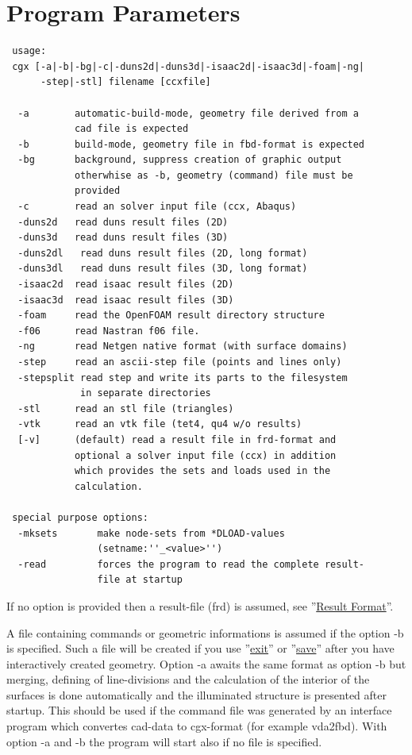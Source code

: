 \documentclass{article}
\providecommand{\htmlref}[2]{\hyperref[#2]{#1}}
\begin{document}
\section{\label{Program Parameters}Program Parameters}
\begin{verbatim}
 usage:
 cgx [-a|-b|-bg|-c|-duns2d|-duns3d|-isaac2d|-isaac3d|-foam|-ng|
      -step|-stl] filename [ccxfile]

  -a        automatic-build-mode, geometry file derived from a 
            cad file is expected
  -b        build-mode, geometry file in fbd-format is expected
  -bg       background, suppress creation of graphic output
            otherwhise as -b, geometry (command) file must be
            provided
  -c        read an solver input file (ccx, Abaqus)              
  -duns2d   read duns result files (2D)                                  
  -duns3d   read duns result files (3D)
  -duns2dl   read duns result files (2D, long format)
  -duns3dl   read duns result files (3D, long format)
  -isaac2d  read isaac result files (2D)                                  
  -isaac3d  read isaac result files (3D)                                  
  -foam     read the OpenFOAM result directory structure
  -f06      read Nastran f06 file.    
  -ng       read Netgen native format (with surface domains)    
  -step     read an ascii-step file (points and lines only)                                  
  -stepsplit read step and write its parts to the filesystem
             in separate directories
  -stl      read an stl file (triangles)                                  
  -vtk      read an vtk file (tet4, qu4 w/o results)                                 
  [-v]      (default) read a result file in frd-format and
            optional a solver input file (ccx) in addition 
            which provides the sets and loads used in the
            calculation.

 special purpose options:                                               
  -mksets       make node-sets from *DLOAD-values 
                (setname:''_<value>'')
  -read         forces the program to read the complete result-
                file at startup
\end{verbatim}
If no option is provided then a result-file (frd) is assumed, see ''\htmlref{Result Format}{Result Format}''.

A file containing commands or geometric informations is assumed if the option -b is specified. Such a file will be created if you use ''\htmlref{exit}{exit}'' or ''\htmlref{save}{save}'' after you have interactively created geometry. Option -a awaits the same format as option -b but merging, defining of line-divisions and the calculation of the interior of the surfaces is done automatically and the illuminated structure is presented after startup. This should be used if the command file was generated by an interface program which convertes cad-data to cgx-format (for example vda2fbd). With option -a and -b the program will start also if no file is specified. 
\end{document}
